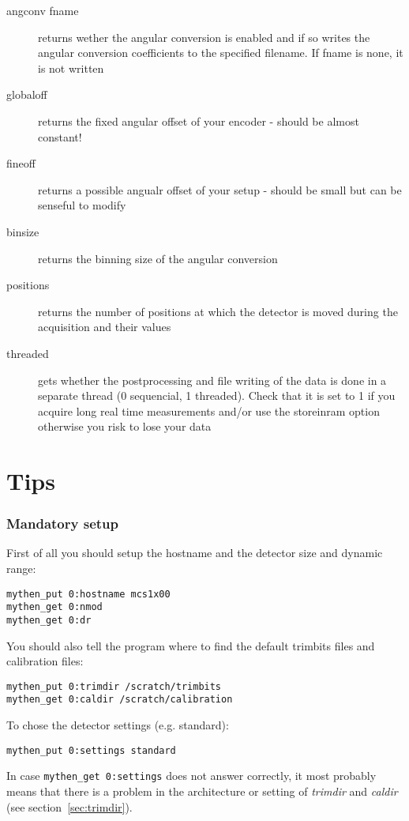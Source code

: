 \documentclass{report}
\begin{document}
\begin{description}
\item[angconv fname]  	returns wether the angular conversion is enabled and if so writes the angular conversion coefficients to the specified filename. If fname is none, it is not written
\item[globaloff]  	returns the fixed angular offset of your encoder - should be almost constant!
\item[fineoff]  returns a possible angualr offset of your setup - should be small but can be senseful to modify
\item[binsize]  	returns the binning size of the angular conversion    
\item[positions]  	returns the number of positions at which the detector is moved during the acquisition and their values
\item[threaded] 	gets whether the postprocessing and file writing of the data is done in a separate thread (0 sequencial, 1 threaded). Check that it is set to 1 if you acquire long real time measurements and/or use the storeinram option otherwise you risk to lose your data
\end{description}

\section{Tips}

\subsubsection{Mandatory setup}
First of all you should setup the hostname and the detector size and dynamic range:
\begin{verbatim}
mythen_put 0:hostname mcs1x00
mythen_get 0:nmod
mythen_get 0:dr
\end{verbatim}
You should also tell the program where to find the default trimbits files and calibration files: 
\begin{verbatim}
mythen_put 0:trimdir /scratch/trimbits
mythen_get 0:caldir /scratch/calibration
\end{verbatim}
To chose the detector settings (e.g. standard):
\begin{verbatim}
mythen_put 0:settings standard
\end{verbatim}
In case \verb=mythen_get 0:settings= does not answer correctly, it most probably means that there is a problem in the architecture or setting of \textit{trimdir} and \textit{caldir} (see section~\ref{sec:trimdir}).
\end{document}
